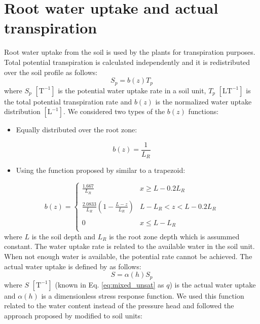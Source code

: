 \documentclass[a4paper,12pt]{article}
\begin{document}
\section{Root water uptake and actual transpiration}
Root water uptake from the soil is used by the plants for transpiration purposes. Total potential transpiration is calculated independently and it is redistributed over the soil profile as follows: 
\begin{equation}
    S_p=b(z)T_p
    \label{eq:rwu_root_dist}
\end{equation}
where $S_p$ $\mathrm{[T^{-1}]}$ is the potential water uptake rate in a soil unit, $T_p$ $\mathrm{[LT^{-1}]}$ is the total potential transpiration rate and $b(z)$ is the normalized water uptake distribution $\mathrm{[L^{-1}]}$. We considered two types of the $b(z)$ functions:
\begin{itemize}
\item Equally distributed over the root zone:
\end{itemize}
\begin{equation}
    b(z)=\frac{1}{L_R}
    \label{eq:rwu_bz_1}
\end{equation}
\begin{itemize}
\item Using the function proposed by \cite{Hoffman1983} similar to a trapezoid:
\end{itemize}
\begin{equation}
  b(z)=%
  \begin{cases}
    \frac{1.667}{L_R} & x\geq L-0.2L_R \\
    \\
    \frac{2.0833}{L_R}(1-\frac{L-z}{L_R}) & L-L_R<z<L-0.2L_R \\
    \\
  	0 & x\leq L-L_R \\
  \end{cases}
\label{eq:rwu_bz_2}
\end{equation}
where $L$ is the soil depth and $L_R$ is the root zone depth which is assummed constant. 
The water uptake rate is related to the available water in the soil unit. When not enough water is available, the potential rate cannot be achieved. The actual water uptake is defined by \cite{Feddes1978} as follows:
 \begin{equation}
    S=\alpha(h)S_p
    \label{eq:rwu_root_stress}
\end{equation}
where $S$ $\mathrm{[T^{-1}]}$ (known in Eq. \ref{eq:mixed_unsat} as $q$) is the actual water uptake and $\alpha(h)$ is a dimensionless stress response function. We used this function related to the water content instead of the pressure head and followed the approach proposed by \cite{FAO1998} modified to soil units:
\end{document}
